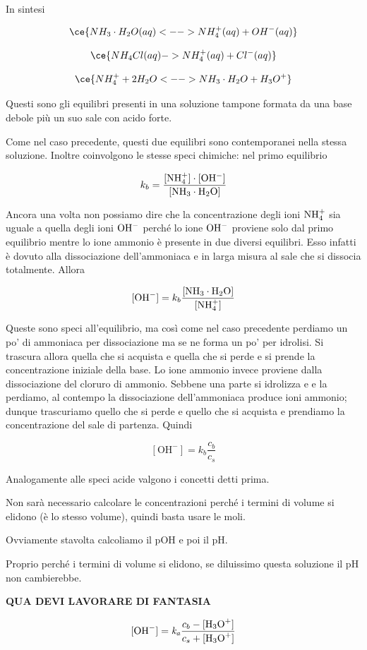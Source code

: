 In sintesi

$$\ce{NH_3 \cdot H_2O(aq) <--> NH_4^+(aq) + OH^-(aq)}$$

$$\ce{NH_4Cl(aq) -> NH_4^+(aq) + Cl^-(aq)}$$

$$\ce{NH_4^+ + 2H_2O <--> NH_3 \cdot H_2O + H_3O^+}$$

Questi sono gli equilibri presenti in una soluzione tampone formata da una base debole più un suo sale con acido forte.

Come nel caso precedente, questi due equilibri sono contemporanei nella stessa soluzione. Inoltre coinvolgono le stesse speci chimiche: nel primo equilibrio

$$k_b = \rm{\frac{[NH_4^+] \cdot [OH^-]}{[NH_3 \cdot H_2O]}}$$

Ancora una volta non possiamo dire che la concentrazione degli ioni $\rm NH_4^+$ sia uguale a quella degli ioni $\rm OH^-$ perché lo ione $\rm OH^-$ proviene solo dal primo equilibrio mentre lo ione ammonio è presente in due diversi equilibri. Esso infatti è dovuto alla dissociazione dell'ammoniaca e in larga misura al sale che si dissocia totalmente. Allora 

$$[\text{OH}^-] = k_b \rm{\frac{[NH_3 \cdot H_2O]}{[NH_4^+]}}$$

Queste sono speci all'equilibrio, ma così come nel caso precedente perdiamo un po' di ammoniaca per dissociazione ma se ne forma un po' per idrolisi. Si trascura allora quella che si acquista e quella che si perde e si prende la concentrazione iniziale della base. Lo ione ammonio invece proviene dalla dissociazione del cloruro di ammonio. Sebbene una parte si idrolizza e e la perdiamo, al contempo la dissociazione dell'ammoniaca produce ioni ammonio; dunque trascuriamo quello che si perde e quello che si acquista e prendiamo la concentrazione del sale di partenza. Quindi

$$[\text{OH}^-] = k_b \frac{c_b}{c_s}$$

Analogamente alle speci acide valgono i concetti detti prima.

Non sarà necessario calcolare le concentrazioni perché i termini di volume si elidono (è lo stesso volume), quindi basta usare le moli.

Ovviamente stavolta calcoliamo il pOH e poi il pH.

Proprio perché i termini di volume si elidono, se diluissimo questa soluzione il pH non cambierebbe.

\textbf{QUA DEVI LAVORARE DI FANTASIA}

$${[\text{OH}^-]}=\textit{k}_\textit{a} \frac{c_b - \rm{[\text{H}_3\text{O}^+]}}{c_s + \rm{[\text{H}_3\text{O}^+]}}$$

